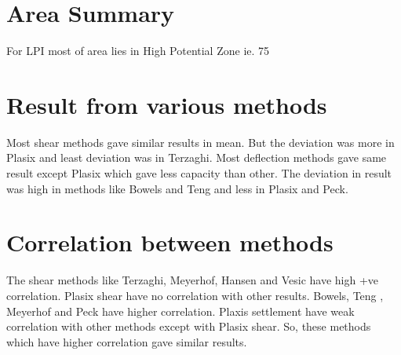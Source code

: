 \section{Area Summary}
For LPI most of area lies in High Potential Zone ie. 75%

\section{Result from various methods}
Most shear methods gave similar results in mean. But the deviation was more in Plasix and least deviation was in Terzaghi.
Most deflection methods gave same result except Plasix which gave less capacity than other. The deviation in result was high in methods like Bowels and Teng and less in Plasix and Peck.

\section{Correlation between methods}
The shear methods like Terzaghi, Meyerhof, Hansen and Vesic have high +ve correlation. Plasix shear have no correlation with other results. Bowels, Teng , Meyerhof and Peck have higher correlation.  Plaxis settlement have weak correlation with other methods except with Plasix shear. So, these methods which have higher correlation gave similar results.